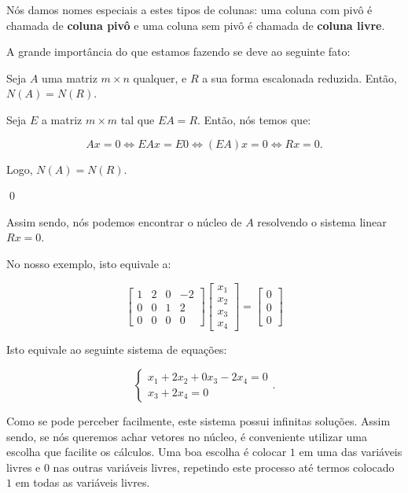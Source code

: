 Nós damos nomes especiais a estes tipos de colunas: uma coluna com pivô é chamada de \textbf{coluna pivô} e uma coluna sem pivô é chamada de \textbf{coluna livre}.

A grande importância do que estamos fazendo se deve ao seguinte fato:

\begin{Proposition}
	Seja $A$ uma matriz $m\times n$ qualquer, e $R$ a sua forma escalonada reduzida. Então, $N(A) = N(R)$.
\end{Proposition}

\begin{Proof}
	Seja $E$ a matriz $m\times m$ tal que $EA = R$. Então, nós temos que:
	
	$$
	Ax = 0 \iff EAx = E0 \iff (EA)x = 0 \iff Rx = 0.
	$$
	
	Logo, $N(A) = N(R)$.
	
	\qed
\end{Proof}

Assim sendo, nós podemos encontrar o núcleo de $A$ resolvendo o sistema linear $Rx = 0$.

No nosso exemplo, isto equivale a:

$$
\begin{bmatrix}
	1 & 2 & 0 & -2 \\
	0 & 0 & 1 & 2 \\
	0 & 0 & 0 & 0
\end{bmatrix}
\begin{bmatrix}
	x_1 \\
	x_2 \\
	x_3 \\
	x_4
\end{bmatrix}
=
\begin{bmatrix}
	0 \\
	0 \\
	0
\end{bmatrix}
$$

Isto equivale ao seguinte sistema de equações:

$$
\begin{cases}
	x_1 + 2x_2 + 0x_3 - 2x_4 = 0\\
	x_3 + 2x_4 = 0
\end{cases}.
$$

Como se pode perceber facilmente, este sistema possui infinitas soluções. Assim sendo, se nós queremos achar vetores no núcleo, é conveniente utilizar uma escolha que facilite os cálculos. Uma boa escolha é colocar $1$ em uma das variáveis livres e $0$ nas outras variáveis livres, repetindo este processo até termos colocado $1$ em todas as variáveis livres.


